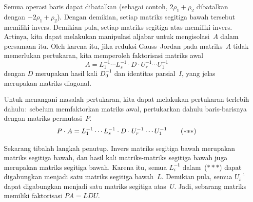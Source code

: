 Semua operasi baris dapat dibatalkan
(sebagai contoh, $2\rho_1+\rho_2$
dibatalkan dengan $-2\rho_1+\rho_2$).
Dengan demikian, setiap matriks segitiga bawah tersebut
memiliki invers.
Demikian pula, setiap matriks segitiga atas memiliki invers.
Artinya, kita dapat melakukan manipulasi aljabar untuk mengisolasi~$A$
dalam persamaan itu.
Oleh karena itu,
jika reduksi Gauss--Jordan pada matriks~$A$ tidak memerlukan pertukaran,
kita memperoleh faktorisasi matriks awal
\begin{equation*} 
  A = L_1^{-1}\cdots L_s^{-1}\cdot D\cdot U_r^{-1}\cdots U_1^{-1}
\end{equation*}
dengan $D$ merupakan hasil kali $D_0^{-1}$ dan identitas parsial~$I$,
yang jelas merupakan matriks diagonal.

Untuk menangani masalah pertukaran, kita dapat melakukan pertukaran terlebih dahulu:~sebelum
memfaktorkan matriks awal, pertukarkan dahulu baris-barisnya
dengan matriks permutasi~$P$.
\begin{equation*}
  P\cdot A = L_1^{-1}\cdots L_s^{-1}\cdot D\cdot U_r^{-1}\cdots U_1^{-1}
  \tag{$*{*}*$}
\end{equation*}

Sekarang tibalah langkah penutup.
Invers matriks segitiga bawah merupakan matriks segitiga bawah,
dan hasil kali matriks-matriks segitiga bawah juga
merupakan matriks segitiga bawah. Karena itu, semua $L_i^{-1}$ dalam~($*{*}*$)
dapat digabungkan menjadi satu matriks segitiga bawah~$L$.
Demikian pula, semua $U_i^{-1}$ dapat digabungkan menjadi satu
matriks segitiga atas~$U$.
Jadi, sebarang matriks memiliki faktorisasi $PA=LDU$.

